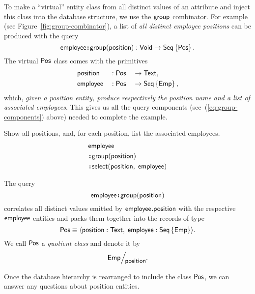 To make a ``virtual'' entity class from all distinct values of an attribute and
inject this class into the database structure, we use the $\textup{\textsf{group}}$ combinator.
For example (see Figure~\ref{fig:group-combinator}), a list of \emph{all
distinct employee positions} can be produced with the query
\begin{equation*}
    \textup{\textsf{employee}}\!\boldsymbol{:}\!\textup{\textsf{group}}(\textup{\textsf{position}}) : \textup{\textsf{Void}} \to \textup{\textsf{Seq}}\left\{\textup{\textsf{Pos}}\right\}.
\end{equation*}
The virtual $\textup{\textsf{Pos}}$ class comes with the primitives
\begin{alignat*}{3}
    & \textup{\textsf{position}} && : \textup{\textsf{Pos}} && \to \textup{\textsf{Text}}, \\
    & \textup{\textsf{employee}} && : \textup{\textsf{Pos}} && \to \textup{\textsf{Seq}}\left\{\textup{\textsf{Emp}}\right\},
\end{alignat*}
which, \emph{given a position entity, produce respectively the position name
and a list of associated employees}.
This gives us all the query components (see~(\ref{eq:group-components}) above)
needed to complete the example.



\addtocounter{example}{-1}
\begin{example}
    Show all positions, and, for each position, list the associated employees.
    \begin{align*}
        & \textup{\textsf{employee}} \\
        & \!\boldsymbol{:}\!\textup{\textsf{group}}(\textup{\textsf{position}}) \\
        & \!\boldsymbol{:}\!\textup{\textsf{select}}(\textup{\textsf{position}},\; \textup{\textsf{employee}})
    \end{align*}
\end{example}

The query
\begin{equation*}
    \textup{\textsf{employee}}\!\boldsymbol{:}\!\textup{\textsf{group}}(\textup{\textsf{position}})
\end{equation*}
correlates all distinct values emitted by $\textup{\textsf{employee}}\boldsymbol{.}\textup{\textsf{position}}$ with the
respective $\textup{\textsf{employee}}$ entities and packs them together into the records of
type
\begin{equation*}
    \textup{\textsf{Pos}} \equiv \langle \textup{\textsf{position}} : \textup{\textsf{Text}},\; \textup{\textsf{employee}} : \textup{\textsf{Seq}}\left\{\textup{\textsf{Emp}}\right\} \rangle.
\end{equation*}
We call $\textup{\textsf{Pos}}$ a \emph{quotient class} and denote it by
\begin{equation*}
    \Quotient{\Emp}{\Position}.
\end{equation*}

Once the database hierarchy is rearranged to include the class $\textup{\textsf{Pos}}$, we can
answer any questions about position entities.

